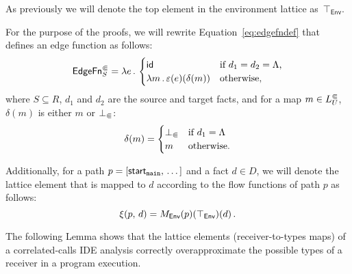 As previously we will denote the top element in the environment lattice as~$\top_\textsf{Env}$.

For the purpose of the proofs, we will rewrite Equation~\eqref{eq:edgefndef} that defines an edge function as follows:
  \begin{equation}\label{eq:edgefnThroughDelta}
    \textsf{EdgeFn}^\Subset_{S}=\lambda e\,.\,
    \begin{cases}
      \textsf{id}&\text{if $d_1=d_2=\Lambda$,}\\
      \lambda m\,.\,\varepsilon(e)(\delta(m))&\text{otherwise},
    \end{cases}
  \end{equation}
  where $S\subseteq R$, $d_1$ and $d_2$ are the source and target facts, and for a map $m\in L^\Subset_U$, $\delta(m)$ is either $m$ or $\bot_\Subset$:
  \begin{equation}\label{eq:deltadef}
    \delta(m)=\begin{cases}
      \bot_\Subset&\text{if $d_1=\Lambda$}\\
      m&\text{otherwise.}
    \end{cases}
  \end{equation}

Additionally, for a path $p=[\textsf{start}_\texttt{main},\,\dots]$ and a fact $d\in D$, we will denote the lattice element that is mapped to $d$ according to the flow functions of path $p$ as follows:
\begin{equation}
  \xi(p,\,d)=M_\textsf{Env}(p)(\top_\textsf{Env})(d)\,.
\end{equation}

The following Lemma shows that the lattice elements (receiver-to-types maps) of a correlated-calls IDE analysis correctly overapproximate the possible types of a receiver in a program execution.

